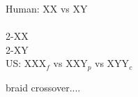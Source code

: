 



Human: XX vs XY \\
\\
2-XX\\
2-XY\\

US: XXX$_f$ vs XXY$_p$ vs XYY$_c$ 









braid crossover....



